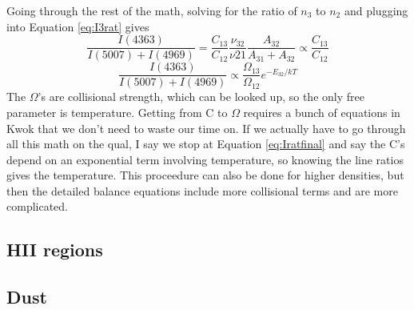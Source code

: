 Going through the rest of the math, solving for the ratio of $n_3$ to $n_2$ and plugging into 
Equation \ref{eq:I3rat} gives
\begin{equation}\label{eq:Iratfinal}
\frac{I(4363)}{I(5007)+I(4969)}=\frac{C_13}{C_12}\frac{\nu_{32}}{\nu{21}}\frac{A_{32}}{A_{31}+A_{32}}\propto\frac{C_13}{C_12}
\end{equation}
\begin{equation}
\frac{I(4363)}{I(5007)+I(4969)}\propto\frac{\Omega_{13}}{\Omega_12}e^{-E_{32}/kT}
\end{equation}
The $\Omega$'s are collisional strength, which can be looked up, so the only free parameter is 
temperature.  Getting from C to $\Omega$ requires a bunch of equations in Kwok that we don't need 
to waste our time on.  If we actually have to go through all this math on the qual, I say 
we stop at Equation \ref{eq:Iratfinal} and say the C's depend on an exponential term involving 
temperature, so knowing the line ratios gives the temperature.  This proceedure can also be 
done for higher densities, but then the detailed balance equations include more collisional terms 
and are more complicated.  

\subsection{HII regions}

\subsection{Dust}

